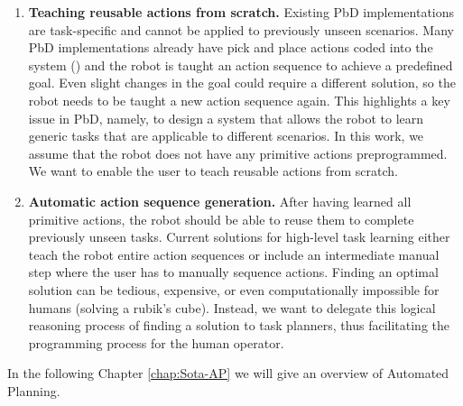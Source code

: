 \begin{enumerate}
	\item{\textbf{Teaching reusable actions from scratch.}
		Existing PbD implementations are task-specific and cannot be applied to previously unseen scenarios.
		Many PbD implementations already have pick and place actions coded into the system (\cite{veeraraghavan2008teaching}) and the robot is taught an action sequence to achieve a predefined goal.
		Even slight changes in the goal could require a different solution, so the robot needs to be taught a new action sequence again.
		This highlights a key issue in PbD, namely, to design a system that allows the robot to learn  generic tasks that are applicable to different scenarios.
		In this work, we assume that the robot does not have any primitive actions preprogrammed.
		We want to enable the user to teach reusable actions from scratch.
	}
	\item{
		\textbf{Automatic action sequence generation.}
		After having learned all primitive actions, the robot should be able to reuse them to complete previously unseen tasks.
		Current solutions for high-level task learning either teach the robot entire action sequences or include an intermediate manual step where the user has to manually sequence actions.
		Finding an optimal solution can be tedious, expensive, or even computationally impossible for humans (\eg solving a rubik's cube).
		Instead, we want to delegate this logical reasoning process of finding a solution to task planners, thus facilitating the programming process for the human operator.
	}
\end{enumerate}
In the following Chapter \ref{chap:Sota-AP} we will give an overview of Automated Planning.